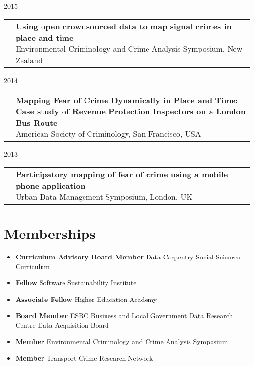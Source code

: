 \documentclass[10pt,a4paper,]{article}
\makeatletter
\providecommand{\tightlist}{%
  \setlength{\itemsep}{0pt}\setlength{\parskip}{0pt}}
\def\briefitem#1#2#3{
#2 & \parbox[t]{0.85\textwidth}{%
      \textbf{#1}\\[-0.1cm]{\footnotesize #3}}\\[0.4cm]}
\def\briefsection#1{\begin{longtable}{@{\extracolsep{\fill}}ll}#1\end{longtable}}
\makeatother
\begin{document}
2015
\briefsection{\briefitem{Using open crowdsourced data to map signal crimes in place and time}{}{Environmental Criminology and Crime Analysis Symposium, New Zealand}\briefitem{Alternative Denominators in Transport Crime Rate}{}{Stockholm Symposium for Criminology, Sweden}}

2014
\briefsection{\briefitem{Mapping Fear of Crime Dynamically in Place and Time: Case study of Revenue Protection Inspectors on a London Bus Route}{}{American Society of Criminology, San Francisco, USA}}

2013
\briefsection{\briefitem{Participatory mapping of fear of crime using a mobile phone application}{}{Urban Data Management Symposium, London, UK}}

\hypertarget{memberships}{%
\section{Memberships}\label{memberships}}

\begin{itemize}
\tightlist
\item
  \textbf{Curriculum Advisory Board Member} Data Carpentry Social Sciences Curriculum
\item
  \textbf{Fellow} Software Sustainability Institute
\item
  \textbf{Associate Fellow} Higher Education Academy
\item
  \textbf{Board Member} ESRC Business and Local Government Data Research Centre Data Acquisition Board
\item
  \textbf{Member} Environmental Criminology and Crime Analysis Symposium
\item
  \textbf{Member} Transport Crime Research Network
\end{itemize}
\end{document}
